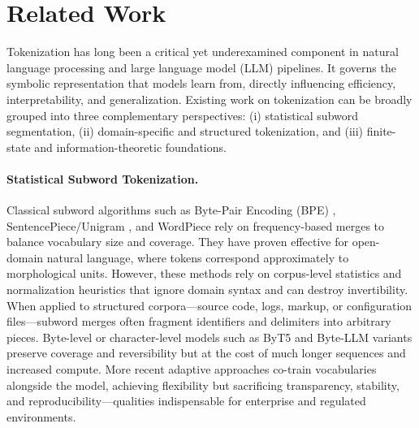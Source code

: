 \section{Related Work}
\label{sec:related}

Tokenization has long been a critical yet underexamined component in natural language processing and large language model (LLM) pipelines.
It governs the symbolic representation that models learn from, directly influencing efficiency, interpretability, and generalization.
Existing work on tokenization can be broadly grouped into three complementary perspectives: (i) statistical subword segmentation, (ii) domain-specific and structured tokenization, and (iii) finite-state and information-theoretic foundations.

\paragraph{Statistical Subword Tokenization.}
Classical subword algorithms such as Byte-Pair Encoding (BPE) \citep{Sennrich2016BPE}, SentencePiece/Unigram \citep{KudoRichardson2018SentencePiece,Kudo2018Unigram}, and WordPiece rely on frequency-based merges to balance vocabulary size and coverage.
They have proven effective for open-domain natural language, where tokens correspond approximately to morphological units.
However, these methods rely on corpus-level statistics and normalization heuristics that ignore domain syntax and can destroy invertibility.
When applied to structured corpora—source code, logs, markup, or configuration files—subword merges often fragment identifiers and delimiters into arbitrary pieces.
Byte-level or character-level models such as ByT5 \citep{Xue2022ByT5} and Byte-LLM variants \citep{Ding2023ByteLevelTradeoff} preserve coverage and reversibility but at the cost of much longer sequences and increased compute.
More recent adaptive approaches \citep{Wei2024VocabCompression} co-train vocabularies alongside the model, achieving flexibility but sacrificing transparency, stability, and reproducibility—qualities indispensable for enterprise and regulated environments.

